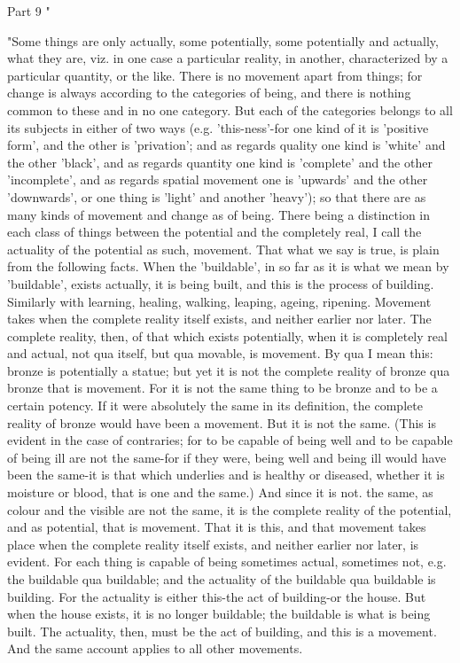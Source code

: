 Part 9 "

"Some things are only actually, some potentially, some potentially
and actually, what they are, viz. in one case a particular reality,
in another, characterized by a particular quantity, or the like. There
is no movement apart from things; for change is always according to
the categories of being, and there is nothing common to these and
in no one category. But each of the categories belongs to all its
subjects in either of two ways (e.g. 'this-ness'-for one kind of it
is 'positive form', and the other is 'privation'; and as regards quality
one kind is 'white' and the other 'black', and as regards quantity
one kind is 'complete' and the other 'incomplete', and as regards
spatial movement one is 'upwards' and the other 'downwards', or one
thing is 'light' and another 'heavy'); so that there are as many kinds
of movement and change as of being. There being a distinction in each
class of things between the potential and the completely real, I call
the actuality of the potential as such, movement. That what we say
is true, is plain from the following facts. When the 'buildable',
in so far as it is what we mean by 'buildable', exists actually, it
is being built, and this is the process of building. Similarly with
learning, healing, walking, leaping, ageing, ripening. Movement takes
when the complete reality itself exists, and neither earlier nor later.
The complete reality, then, of that which exists potentially, when
it is completely real and actual, not qua itself, but qua movable,
is movement. By qua I mean this: bronze is potentially a statue; but
yet it is not the complete reality of bronze qua bronze that is movement.
For it is not the same thing to be bronze and to be a certain potency.
If it were absolutely the same in its definition, the complete reality
of bronze would have been a movement. But it is not the same. (This
is evident in the case of contraries; for to be capable of being well
and to be capable of being ill are not the same-for if they were,
being well and being ill would have been the same-it is that which
underlies and is healthy or diseased, whether it is moisture or blood,
that is one and the same.) And since it is not. the same, as colour
and the visible are not the same, it is the complete reality of the
potential, and as potential, that is movement. That it is this, and
that movement takes place when the complete reality itself exists,
and neither earlier nor later, is evident. For each thing is capable
of being sometimes actual, sometimes not, e.g. the buildable qua buildable;
and the actuality of the buildable qua buildable is building. For
the actuality is either this-the act of building-or the house. But
when the house exists, it is no longer buildable; the buildable is
what is being built. The actuality, then, must be the act of building,
and this is a movement. And the same account applies to all other
movements. 

